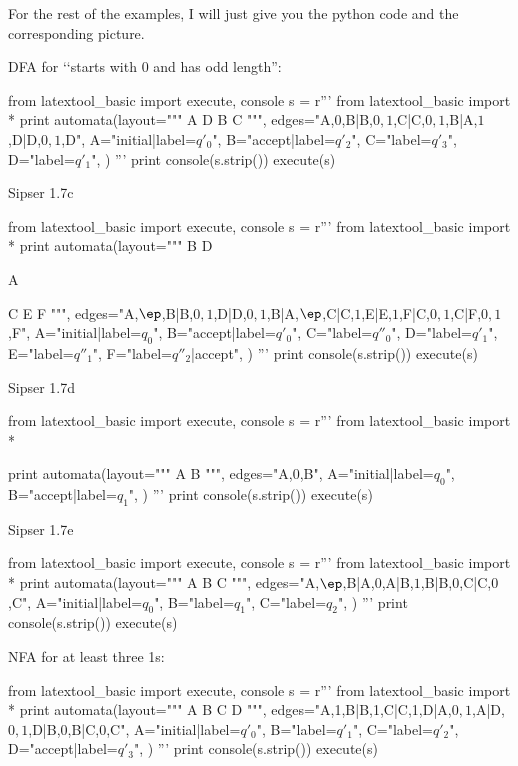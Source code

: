 For the rest of the examples, I will
just give you the python code and the corresponding picture.






DFA for \lq\lq starts with 0 and has odd length'':
\begin{python}
from latextool_basic import execute, console
s = r'''
from latextool_basic import * 
print automata(layout="""
A D B C
""",
edges="A,$0$,B|B,$0,1$,C|C,$0,1$,B|A,$1$,D|D,$0,1$,D",
A="initial|label=$q'_0$",
B="accept|label=$q'_2$",
C="label=$q'_3$",
D="label=$q'_1$",
)
'''
print console(s.strip())
execute(s)
\end{python}




Sipser 1.7c
\begin{python}
from latextool_basic import execute, console
s = r'''
from latextool_basic import * 
print automata(layout="""
  B  D
  
A

  C  E  F
""",
edges="A,$\ep$,B|B,$0,1$,D|D,$0,1$,B|A,$\ep$,C|C,$1$,E|E,$1$,F|C,$0,1$,C|F,$0,1$,F",
A="initial|label=$q_0$",
B="accept|label=$q'_0$",
C="label=$q''_0$",
D="label=$q'_1$",
E="label=$q''_1$",
F="label=$q''_2$|accept",              
)
'''
print console(s.strip())
execute(s)
\end{python}




Sipser 1.7d
\begin{python}
from latextool_basic import execute, console
s = r'''
from latextool_basic import * 

print automata(layout="""
A B
""",
edges="A,$0$,B",
A="initial|label=$q_0$",
B="accept|label=$q_1$",
)
'''
print console(s.strip())
execute(s)
\end{python}





Sipser 1.7e
\begin{python}
from latextool_basic import execute, console
s = r'''
from latextool_basic import * 
print automata(layout="""
A B C
""",
edges="A,$\ep$,B|A,$0$,A|B,$1$,B|B,$0$,C|C,$0$,C",
A="initial|label=$q_0$",
B="label=$q_1$",
C="label=$q_2$",              
)
'''
print console(s.strip())
execute(s)
\end{python}




NFA for at least three 1s:
\begin{python}
from latextool_basic import execute, console
s = r'''
from latextool_basic import * 
print automata(layout="""
A B C D
""",
edges="A,1,B|B,1,C|C,1,D|A,$0,1$,A|D,$0,1$,D|B,0,B|C,0,C",
A="initial|label=$q'_0$",
B="label=$q'_1$",
C="label=$q'_2$",
D="accept|label=$q'_3$",
)
'''
print console(s.strip())
execute(s)
\end{python}



